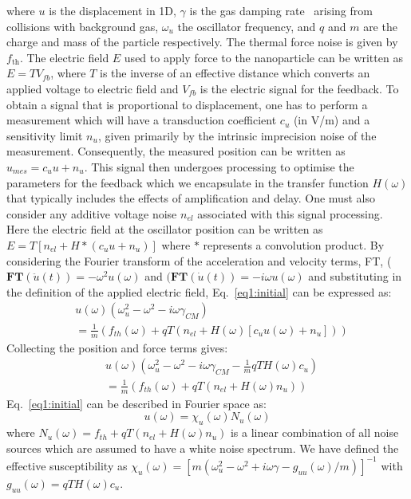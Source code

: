 \documentclass[aps,pra,twocolumn,nopacs,superscriptaddress,groupedaddress]{revtex4}
\begin{document}
\noindent where $u$ is the displacement in 1D, $\gamma$ is the gas damping rate~\cite{Epstein1924on,Cavalleri2010gas} arising from collisions with background gas, $\omega_u$ the oscillator frequency, and $q$ and $m$ are the charge and mass of the particle respectively. The thermal force noise is given by $f_{\text{th}}$. The electric field $E$ used to apply force to the nanoparticle can be written as $E= T V_{fb}$, where $T$ is the inverse of an effective distance which converts an applied voltage to electric field and $V_{fb}$ is the electric signal for the feedback.  To obtain a signal that is proportional to displacement, one has to perform a measurement which will have a transduction coefficient $c_u$ (in V/m) and a sensitivity limit $n_u$, given primarily by the intrinsic imprecision noise of the measurement. Consequently, the measured position can be written as $u_{mes}=c_u u+n_u$. This signal then undergoes processing to optimise the parameters for the feedback which we encapsulate in the transfer function $H(\omega)$ that typically includes the effects of amplification and delay. One must also consider any additive voltage noise $n_{el}$ associated with this signal processing. Here the electric field at the oscillator position can be written as $E=T [ n_{el}+H \ast (c_u u +n_u)]$ where $ \ast $ represents a convolution product. By considering the Fourier transform of the acceleration and velocity terms, FT, ($\textbf{FT}(\ddot{u}(t))=-\omega^2u(\omega)$ and $(\textbf{FT}(\dot{u}(t))=-i\omega u(\omega)$ and substituting in the definition of the applied electric field, Eq.~\ref{eq1:initial} can be expressed as:
\begin{equation}\label{eq:6.2}
\begin{split}
    &u(\omega)(\omega^2_u -\omega^2 -i\omega\gamma_{CM}) \\
    &=\frac{1}{m}(f_{th}(\omega)+qT(n_{el}+H(\omega)[c_u u(\omega) +n_u]))
\end{split}
\end{equation}
Collecting the position and force terms gives:
\begin{equation}\label{eq:6.3}
\begin{split}
   & u(\omega)(\omega^2_u -\omega^2 -i\omega\gamma_{CM}-\frac{1}{m}qTH(\omega)c_u) \\
   & =\frac{1}{m}(f_{th}(\omega)+qT(n_{el}+H(\omega)n_u))
\end{split}
\end{equation}         
Eq.~\ref{eq1:initial} can be described in Fourier space as:
\begin{equation}\label{eq2:fourier}
  u(\omega)= \chi_u(\omega) N_u(\omega)
\end{equation}
\noindent where $N_u(\omega)=f_{th}+qT(n_{el}+H(\omega) n_u)$ is a linear combination of all noise sources which are assumed to have a white noise spectrum. We have defined the effective susceptibility as $\chi_u(\omega)=[m(\omega_u^2-\omega^2+i\omega \gamma-g_{uu}(\omega)/m)]^{-1}$ with $g_{uu}(\omega)=q T H(\omega) c_u$.
\end{document}
